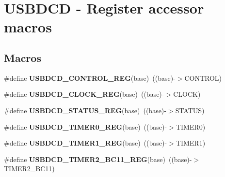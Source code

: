\hypertarget{group__USBDCD__Register__Accessor__Macros}{}\section{U\+S\+B\+D\+CD -\/ Register accessor macros}
\label{group__USBDCD__Register__Accessor__Macros}
\subsection*{Macros}
\begin{DoxyCompactItemize}
\item 
\#define {\bfseries U\+S\+B\+D\+C\+D\+\_\+\+C\+O\+N\+T\+R\+O\+L\+\_\+\+R\+EG}(base)~((base)-\/$>$C\+O\+N\+T\+R\+OL)\hypertarget{group__USBDCD__Register__Accessor__Macros_gaf1ee3cf2e633cf144d3031b73dc86777}{}\label{group__USBDCD__Register__Accessor__Macros_gaf1ee3cf2e633cf144d3031b73dc86777}

\item 
\#define {\bfseries U\+S\+B\+D\+C\+D\+\_\+\+C\+L\+O\+C\+K\+\_\+\+R\+EG}(base)~((base)-\/$>$C\+L\+O\+CK)\hypertarget{group__USBDCD__Register__Accessor__Macros_ga4472319b2e3fbc759dcbbdd1d59eb774}{}\label{group__USBDCD__Register__Accessor__Macros_ga4472319b2e3fbc759dcbbdd1d59eb774}

\item 
\#define {\bfseries U\+S\+B\+D\+C\+D\+\_\+\+S\+T\+A\+T\+U\+S\+\_\+\+R\+EG}(base)~((base)-\/$>$S\+T\+A\+T\+US)\hypertarget{group__USBDCD__Register__Accessor__Macros_gad3a65d4e3ab4e0956460892d8c7b5fe9}{}\label{group__USBDCD__Register__Accessor__Macros_gad3a65d4e3ab4e0956460892d8c7b5fe9}

\item 
\#define {\bfseries U\+S\+B\+D\+C\+D\+\_\+\+T\+I\+M\+E\+R0\+\_\+\+R\+EG}(base)~((base)-\/$>$T\+I\+M\+E\+R0)\hypertarget{group__USBDCD__Register__Accessor__Macros_gae3497bee34a13efbb8f41a7ab49af474}{}\label{group__USBDCD__Register__Accessor__Macros_gae3497bee34a13efbb8f41a7ab49af474}

\item 
\#define {\bfseries U\+S\+B\+D\+C\+D\+\_\+\+T\+I\+M\+E\+R1\+\_\+\+R\+EG}(base)~((base)-\/$>$T\+I\+M\+E\+R1)\hypertarget{group__USBDCD__Register__Accessor__Macros_ga5bfe8c0ea39fd49431de364a87fb4638}{}\label{group__USBDCD__Register__Accessor__Macros_ga5bfe8c0ea39fd49431de364a87fb4638}

\item 
\#define {\bfseries U\+S\+B\+D\+C\+D\+\_\+\+T\+I\+M\+E\+R2\+\_\+\+B\+C11\+\_\+\+R\+EG}(base)~((base)-\/$>$T\+I\+M\+E\+R2\+\_\+\+B\+C11)\hypertarget{group__USBDCD__Register__Accessor__Macros_gafc77e996dc7db824a47b33bb77c9600d}{}\label{group__USBDCD__Register__Accessor__Macros_gafc77e996dc7db824a47b33bb77c9600d}


\end{DoxyCompactItemize}
